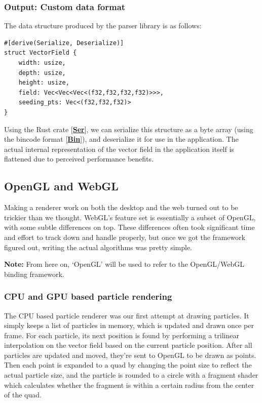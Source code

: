 \documentclass{article}
\newcommand{\code}[1]{\fcolorbox{codebd}{codebg}{\lstinline[basicstyle=\ttfamily\color{codefg}]{#1}}}
\newcommand{\reference}[1]{[\hyperref[ref:#1]{\textbf{#1}}]}
\begin{document}
\subsubsection*{Output: Custom data format}

The data structure produced by the parser library is as follows:

\begin{verbatim}
#[derive(Serialize, Deserialize)]
struct VectorField {
    width: usize,
    depth: usize,
    height: usize,
    field: Vec<Vec<Vec<(f32,f32,f32,f32)>>>,
    seeding_pts: Vec<(f32,f32,f32)>
}
\end{verbatim}

Using the Rust crate \code{serde} \reference{Ser}, we can serialize this structure as a byte array (using the bincode format \reference{Bin}), and deserialize it for use in the application. The actual internal representation of the vector field in the application itself is flattened due to perceived performance benefits.

\subsection*{OpenGL and WebGL}

Making a renderer work on both the desktop and the web turned out to be trickier than we thought. WebGL's feature set is essentially a subset of OpenGL, with some subtle differences on top. These differences often took significant time and effort to track down and handle properly, but once we got the framework figured out, writing the actual algorithms was pretty simple.

\textbf{Note:} From here on, `OpenGL' will be used to refer to the OpenGL/WebGL binding framework.

\subsubsection*{CPU and GPU based particle rendering}

The CPU based particle renderer was our first attempt at drawing particles. It simply keeps a list of particles in memory, which is updated and drawn once per frame. For each particle, its next position is found by performing a trilinear interpolation on the vector field based on the current particle position. After all particles are updated and moved, they're sent to OpenGL to be drawn as points. Then each point is expanded to a quad by changing the point size to reflect the actual particle size, and the particle is rounded to a circle with a fragment shader which calculates whether the fragment is within a certain radius from the center of the quad.
\end{document}
